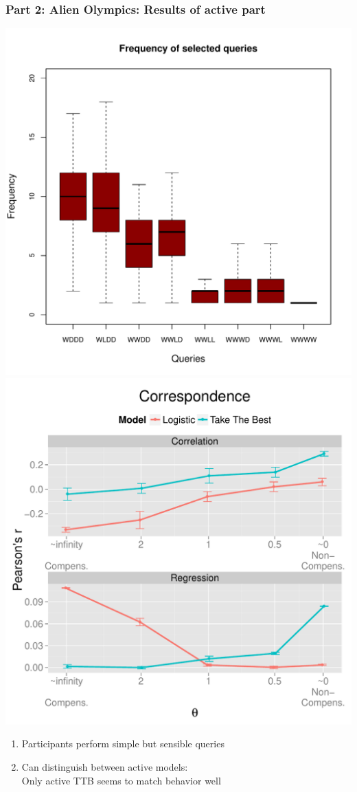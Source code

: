 \documentclass{beamer}
\begin{document}
\begin{frame}
    \frametitle{Part 2: Alien Olympics:  Results of active part}
 \includegraphics[scale=0.3]{shortoverview.pdf}
 \includegraphics[scale=0.3]{results.pdf}
\vspace{-0.3cm}
\begin{enumerate}
\item Participants perform simple but sensible queries
\item Can distinguish between active models:\\
Only active TTB seems to match behavior well
\end{enumerate}
\end{frame}
\end{document}
